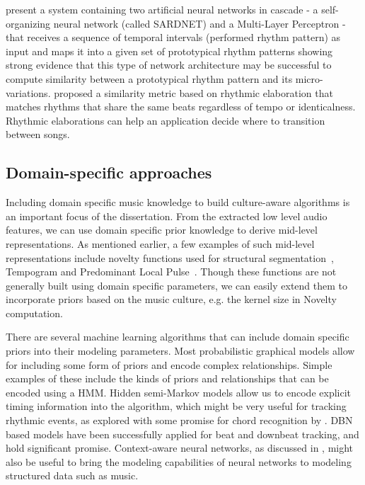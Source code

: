  present a system containing two artificial neural networks in cascade - a self-organizing neural network (called SARDNET) and a Multi-Layer Perceptron - that receives a sequence of temporal intervals (performed rhythm pattern) as input and maps it into a given set of prototypical rhythm patterns showing strong evidence that this type of network architecture may be successful to compute similarity between a prototypical rhythm pattern and its micro-variations.  proposed a similarity metric based on rhythmic elaboration that matches rhythms that share the same beats regardless of tempo or identicalness. Rhythmic elaborations can help an application decide where to transition between songs.
\subsection{Domain-specific approaches}
Including domain specific music knowledge to build culture-aware algorithms is an important focus of the dissertation. From the extracted low level audio features, we can use domain specific prior knowledge to derive mid-level representations. As mentioned earlier, a few examples of such mid-level representations include novelty functions used for structural segmentation~\cite{foote:00:novelty}, Tempogram and Predominant Local Pulse~\cite{grosche:11:tempogram}. Though these functions are not generally built using domain specific parameters, we can easily extend them to incorporate priors based on the music culture, e.g. the kernel size in Novelty computation. 

There are several machine learning algorithms that can include domain specific priors into their modeling parameters. Most probabilistic graphical models allow for including some form of priors and encode complex relationships. Simple examples of these include the kinds of priors and relationships that can be encoded using a \gls{HMM}. Hidden semi-Markov models allow us to encode explicit timing information into the algorithm, which might be very useful for tracking rhythmic events, as explored with some promise for chord recognition by . \gls{DBN} \cite{murphy:02:thesis} based models have been successfully applied for beat and downbeat tracking, and hold significant promise. Context-aware neural networks, as discussed in , might also be useful to bring the modeling capabilities of neural networks to modeling structured data such as music. 
